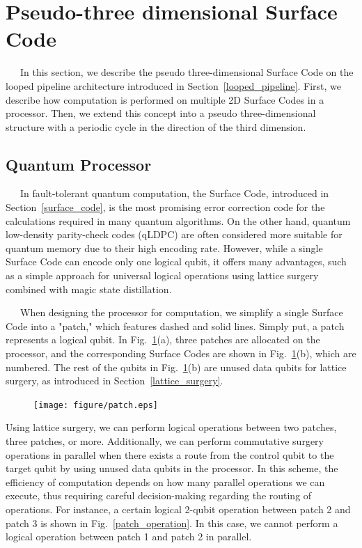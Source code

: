 \documentclass[a4paper,11pt]{ltjsarticle}
\begin{document}
\section{Pseudo-three dimensional Surface Code}\label{pseudo-three-dimensional_surface_code}{
    \ \ \ In this section, we describe the pseudo three-dimensional Surface Code on the looped pipeline architecture introduced in Section~\ref{looped_pipeline}. First, we describe how computation is performed on multiple 2D Surface Codes in a processor. Then, we extend this concept into a pseudo three-dimensional structure with a periodic cycle in the direction of the third dimension.

    \subsection{Quantum Processor}{
        \ \ \ In fault-tolerant quantum computation, the Surface Code, introduced in Section~\ref{surface_code}, is the most promising error correction code for the calculations required in many quantum algorithms. On the other hand, quantum low-density parity-check codes (qLDPC) are often considered more suitable for quantum memory due to their high encoding rate. However, while a single Surface Code can encode only one logical qubit, it offers many advantages, such as a simple approach for universal logical operations using lattice surgery combined with magic state distillation.

        \ \ \ When designing the processor for computation, we simplify a single Surface Code into a "patch," which features dashed and solid lines. Simply put, a patch represents a logical qubit. In Fig.~\ref{patch}(a), three patches are allocated on the processor, and the corresponding Surface Codes are shown in Fig.~\ref{patch}(b), which are numbered. The rest of the qubits in Fig.~\ref{patch}(b) are unused data qubits for lattice surgery, as introduced in Section~\ref{lattice_surgery}.
        \begin{figure}[h]
            \centering
            \texttt{[image: figure/patch.eps]}
            \vspace{0pt}\caption{}
            \label{patch}
            \vspace{-10pt}
        \end{figure}

        \clearpage

        Using lattice surgery, we can perform logical operations between two patches, three patches, or more. Additionally, we can perform commutative surgery operations in parallel when there exists a route from the control qubit to the target qubit by using unused data qubits in the processor. In this scheme, the efficiency of computation depends on how many parallel operations we can execute, thus requiring careful decision-making regarding the routing of operations. For instance, a certain logical 2-qubit operation between patch 2 and patch 3 is shown in Fig.~\ref{patch_operation}. In this case, we cannot perform a logical operation between patch 1 and patch 2 in parallel.

}}
\end{document}
